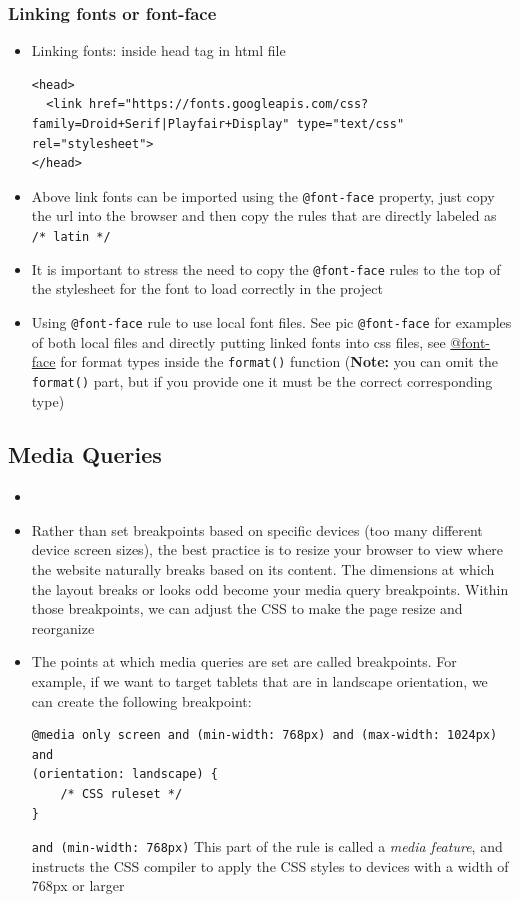 \documentclass[a4paper, 12pt]{article}
\begin{document}
\subsubsection{Linking fonts or font-face}
\begin{itemize}
\item Linking fonts: inside head tag in html file
\begin{verbatim}
<head>
  <link href="https://fonts.googleapis.com/css?family=Droid+Serif|Playfair+Display" type="text/css" rel="stylesheet">
</head>
\end{verbatim}

\item Above link fonts can be imported using the \verb|@font-face| property, just copy the url into the browser and then copy the rules that are directly labeled as \verb|/* latin */|

\item It is important to stress the need to copy the \verb|@font-face| rules to the top of the stylesheet for the font to load correctly in the project

\item Using \verb|@font-face| rule to use local font files. See pic \verb|@font-face| for examples of both local files and directly putting linked fonts into css files, see \href{https://developer.mozilla.org/en-US/docs/Web/CSS/@font-face}{@font-face} for format types inside the \verb|format()| function (\textbf{Note:} you can omit the \verb|format()| part, but if you provide one it must be the correct corresponding type)
\end{itemize}



\subsection{Media Queries}
\begin{itemize}
\item 

\item Rather than set breakpoints based on specific devices (too many different device screen sizes), the best practice is to resize your browser to view where the website naturally breaks based on its content. The dimensions at which the layout breaks or looks odd become your media query breakpoints. Within those breakpoints, we can adjust the CSS to make the page resize and reorganize

\item The points at which media queries are set are called breakpoints. For example, if we want to target tablets that are in landscape orientation, we can create the following breakpoint:
\begin{verbatim}
@media only screen and (min-width: 768px) and (max-width: 1024px) and 
(orientation: landscape) {
    /* CSS ruleset */
}
\end{verbatim}
\verb|and (min-width: 768px)| \textemdash This part of the rule is called a \textit{media feature}, and instructs the CSS compiler to apply the CSS styles to devices with a width of 768px or larger

\end{itemize}
\end{document}
